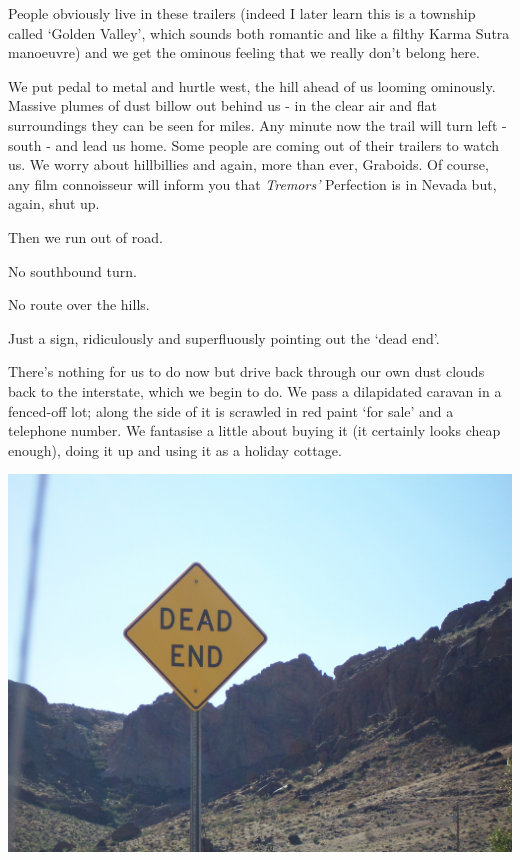 \documentclass[a5paper,titlepage,11pt]{book}
\begin{document}
People obviously live in these trailers (indeed I later learn this is a township called `Golden Valley', which sounds both romantic and like a filthy Karma Sutra manoeuvre) and we get the ominous feeling that we really don't belong here.

We put pedal to metal and hurtle west, the hill ahead of us looming ominously. Massive plumes of dust billow out behind us - in the clear air and flat surroundings they can be seen for miles. Any minute now the trail will turn left - south - and lead us home. Some people are coming out of their trailers to watch us. We worry about hillbillies and again, more than ever, Graboids. Of course, any film connoisseur will inform you that \emph{Tremors'} Perfection is in Nevada but, again, shut up.

Then we run out of road.

No southbound turn.

No route over the hills.

Just a sign, ridiculously and superfluously pointing out the `dead end'.

There's nothing for us to do now but drive back through our own dust clouds back to the interstate, which we begin to do. We pass a dilapidated caravan in a fenced-off lot; along the side of it is scrawled in red paint `for sale' and a telephone number. We fantasise a little about buying it (it certainly looks cheap enough), doing it up and using it as a holiday cottage.

\begin{center}\includegraphics[width=\textwidth]{gfx/100_1536}\end{center}
\end{document}
